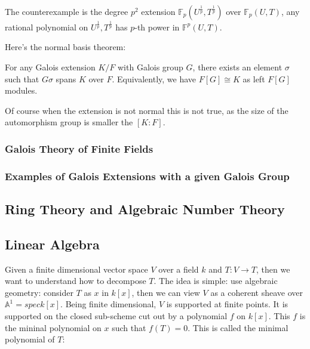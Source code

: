 \documentclass[main.tex]{subfiles}
\begin{document}
\begin{remark}
The counterexample is the degree $p^2$ extension $\mathbb{F}_p(U^\frac{1}{p}, T^\frac{1}{p})$ over $\mathbb{F}_p(U,T)$, any rational polynomial on $U^\frac{1}{p}, T^\frac{1}{p}$ has $p$-th power in $\mathbb{F}^p(U,T)$.
\end{remark}

Here's the normal basis theorem:
\begin{theorem}
For any Galois extension $K/F$ with Galois group $G$, there exists an element $\sigma$ such that $G \sigma$ spans $K$ over $F$. Equivalently, we have $F[G] \cong K$ as left $F[G]$ modules. 
\end{theorem}

\begin{remark}
Of course when the extension is not normal this is not true, as the size of the automorphism group is smaller the $[K:F]$.
\end{remark}

\subsubsection{Galois Theory of Finite Fields}


\subsubsection{Examples of Galois Extensions with a given Galois Group}



\subsection{Ring Theory and Algebraic Number Theory}


\subsection{Linear Algebra}


Given a finite dimensional vector space $V$ over a field $k$ and $T: V \rightarrow T$, then we want to understand how to decompose $T$. The idea is simple: use algebraic geometry: consider $T$ as $x$ in $k[x]$, then we can view $V$ as a coherent sheave over $\mathbb{A}^1 = spec k[x]$. Being finite dimensional, $V$ is supported at finite points. It is supported on the closed sub-scheme cut out by a polynomial $f$ on $k[x]$. This $f$ is the mininal polynomial on $x$ such that $f(T) = 0$. This is called the minimal polynomial of $T$: 
\end{document}

